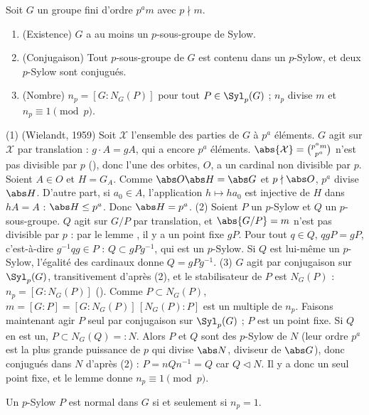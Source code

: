 \begin{theoreme}[Sylow, 1872]\label{thm-sylow}
Soit $G$ un groupe fini d'ordre $p^am$ avec $p\nmid m$.
\begin{enumerate}
\item (Existence) $G$ a au moins un $p$-sous-groupe de Sylow.
\item (Conjugaison) Tout $p$-sous-groupe de $G$ est contenu dans un $p$-Sylow, et deux $p$-Sylow sont conjugués.
\item (Nombre) $n_p=[G:N_G(P)]$ pour tout $P\in\Syl_p(G)$ ; $n_p$ divise $m$ et $n_p\equiv1\pmod p$.
\end{enumerate}
\end{theoreme}
\begin{preuve}
(1) (Wielandt, 1959) Soit $\mathcal X$ l'ensemble des parties de $G$ à $p^a$ éléments. $G$ agit sur $\mathcal X$ par translation : $g\cdot A=gA$, qui a encore $p^a$ éléments. $\abs{\mathcal X}=\binom{p^am}{p^a}$ n'est pas divisible par $p$ (), donc l'une des orbites, $O$, a un cardinal non divisible par $p$. Soient $A\in O$ et $H=G_A$. Comme $\abs O\abs H=\abs G$ et $p\nmid\abs O$, $p^a$ divise $\abs H$. D'autre part, si $a_0\in A$, l'application $h\mapsto ha_0$ est injective de $H$ dans $hA=A$ : $\abs H\le p^a$. Donc $\abs H=p^a$.
(2) Soient $P$ un $p$-Sylow et $Q$ un $p$-sous-groupe. $Q$ agit sur $G/P$ par translation, et $\abs{G/P}=m$ n'est pas divisible par $p$ : par le lemme , il y a un point fixe $gP$. Pour tout $q\in Q$, $qgP=gP$, c'est-à-dire $g^{-1}qg\in P$ : $Q\subset gPg^{-1}$, qui est un $p$-Sylow. Si $Q$ est lui-même un $p$-Sylow, l'égalité des cardinaux donne $Q=gPg^{-1}$.
(3) $G$ agit par conjugaison sur $\Syl_p(G)$, transitivement d'après (2), et le stabilisateur de $P$ est $N_G(P)$ : $n_p=[G:N_G(P)]$ (). Comme $P\subset N_G(P)$, $m=[G:P]=[G:N_G(P)]\,[N_G(P):P]$ est un multiple de $n_p$. Faisons maintenant agir $P$ seul par conjugaison sur $\Syl_p(G)$ ; $P$ est un point fixe. Si $Q$ en est un, $P\subset N_G(Q)=:N$. Alors $P$ et $Q$ sont des $p$-Sylow de $N$ (leur ordre $p^a$ est la plus grande puissance de $p$ qui divise $\abs N$, diviseur de $\abs G$), donc conjugués dans $N$ d'après (2) : $P=nQn^{-1}=Q$ car $Q\lhd N$. Il y a donc un seul point fixe, et le lemme  donne $n_p\equiv1\pmod p$.
\end{preuve}
\begin{corollaire}\label{cor-sylow-normal}
Un $p$-Sylow $P$ est normal dans $G$ si et seulement si $n_p=1$.
\end{corollaire}
